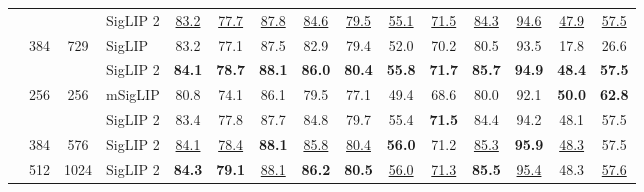 \begin{tabular}{lcclccccccccccc}
 &  &  & \cellcolor{gray!15}SigLIP 2 & \cellcolor{gray!15}\underline{83.2} & \cellcolor{gray!15}\underline{77.7} & \cellcolor{gray!15}\underline{87.8} & \cellcolor{gray!15}\underline{84.6} & \cellcolor{gray!15}\underline{79.5} & \cellcolor{gray!15}\underline{55.1} & \cellcolor{gray!15}\underline{71.5} & \cellcolor{gray!15}\underline{84.3} & \cellcolor{gray!15}\underline{94.6} & \cellcolor{gray!15}\underline{47.9} & \cellcolor{gray!15}\underline{57.5} \\
\arrayrulecolor{lightgray}\hhline{|~|--------------|} 
 & \multirow[c]{2}{*}{384} & \multirow[c]{2}{*}{729} & SigLIP \cite{siglip} & 83.2 & 77.1 & 87.5 & 82.9 & 79.4 & 52.0 & 70.2 & 80.5 & 93.5 & 17.8 & 26.6 \\
 &  &  & \cellcolor{gray!15}SigLIP 2 & \cellcolor{gray!15}\bf{84.1} & \cellcolor{gray!15}\bf{78.7} & \cellcolor{gray!15}\bf{88.1} & \cellcolor{gray!15}\bf{86.0} & \cellcolor{gray!15}\bf{80.4} & \cellcolor{gray!15}\bf{55.8} & \cellcolor{gray!15}\bf{71.7} & \cellcolor{gray!15}\bf{85.7} & \cellcolor{gray!15}\bf{94.9} & \cellcolor{gray!15}\bf{48.4} & \cellcolor{gray!15}\bf{57.5} \\
\arrayrulecolor{black}\hhline{|---------------|} 
\multirow[c]{4}{*}{So/16} & \multirow[c]{2}{*}{256} & \multirow[c]{2}{*}{256} & mSigLIP \cite{siglip} & 80.8 & 74.1 & 86.1 & 79.5 & 77.1 & 49.4 & 68.6 & 80.0 & 92.1 & \bf{50.0} & \bf{62.8} \\
 &  &  & \cellcolor{gray!15}SigLIP 2 & \cellcolor{gray!15}83.4 & \cellcolor{gray!15}77.8 & \cellcolor{gray!15}87.7 & \cellcolor{gray!15}84.8 & \cellcolor{gray!15}79.7 & \cellcolor{gray!15}55.4 & \cellcolor{gray!15}\bf{71.5} & \cellcolor{gray!15}84.4 & \cellcolor{gray!15}94.2 & \cellcolor{gray!15}48.1 & \cellcolor{gray!15}57.5 \\
\arrayrulecolor{lightgray}\hhline{|~|--------------|} 
 & 384 & 576 & \cellcolor{gray!15}SigLIP 2 & \cellcolor{gray!15}\underline{84.1} & \cellcolor{gray!15}\underline{78.4} & \cellcolor{gray!15}\bf{88.1} & \cellcolor{gray!15}\underline{85.8} & \cellcolor{gray!15}\underline{80.4} & \cellcolor{gray!15}\bf{56.0} & \cellcolor{gray!15}71.2 & \cellcolor{gray!15}\underline{85.3} & \cellcolor{gray!15}\bf{95.9} & \cellcolor{gray!15}\underline{48.3} & \cellcolor{gray!15}57.5 \\
\arrayrulecolor{lightgray}\hhline{|~|--------------|} 
 & 512 & 1024 & \cellcolor{gray!15}SigLIP 2 & \cellcolor{gray!15}\bf{84.3} & \cellcolor{gray!15}\bf{79.1} & \cellcolor{gray!15}\underline{88.1} & \cellcolor{gray!15}\bf{86.2} & \cellcolor{gray!15}\bf{80.5} & \cellcolor{gray!15}\underline{56.0} & \cellcolor{gray!15}\underline{71.3} & \cellcolor{gray!15}\bf{85.5} & \cellcolor{gray!15}\underline{95.4} & \cellcolor{gray!15}48.3 & \cellcolor{gray!15}\underline{57.6} \\

\end{tabular}
